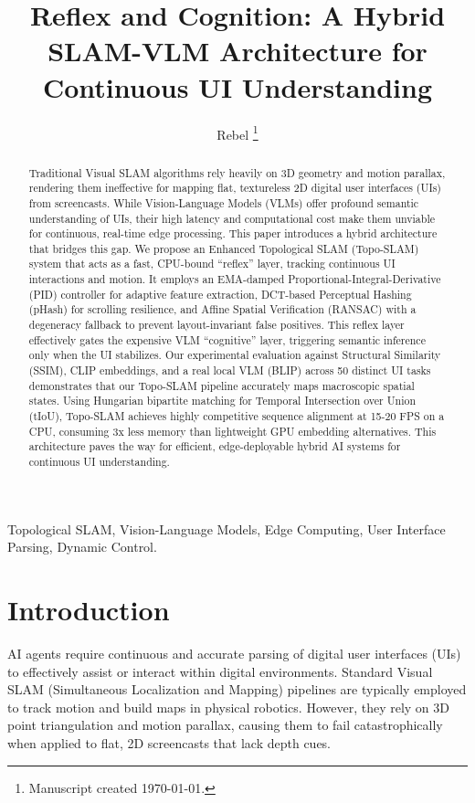 \documentclass[journal]{IEEEtran}
\begin{document}
\title{Reflex and Cognition: A Hybrid SLAM-VLM Architecture for Continuous UI Understanding}

\author{Rebel
\thanks{Manuscript created \today.}}

\maketitle

\begin{abstract}
Traditional Visual SLAM algorithms rely heavily on 3D geometry and motion parallax, rendering them ineffective for mapping flat, textureless 2D digital user interfaces (UIs) from screencasts. While Vision-Language Models (VLMs) offer profound semantic understanding of UIs, their high latency and computational cost make them unviable for continuous, real-time edge processing. This paper introduces a hybrid architecture that bridges this gap. We propose an Enhanced Topological SLAM (Topo-SLAM) system that acts as a fast, CPU-bound ``reflex'' layer, tracking continuous UI interactions and motion. It employs an EMA-damped Proportional-Integral-Derivative (PID) controller for adaptive feature extraction, DCT-based Perceptual Hashing (pHash) for scrolling resilience, and Affine Spatial Verification (RANSAC) with a degeneracy fallback to prevent layout-invariant false positives. This reflex layer effectively gates the expensive VLM ``cognitive'' layer, triggering semantic inference only when the UI stabilizes. Our experimental evaluation against Structural Similarity (SSIM), CLIP embeddings, and a real local VLM (BLIP) across 50 distinct UI tasks demonstrates that our Topo-SLAM pipeline accurately maps macroscopic spatial states. Using Hungarian bipartite matching for Temporal Intersection over Union (tIoU), Topo-SLAM achieves highly competitive sequence alignment at 15-20 FPS on a CPU, consuming 3x less memory than lightweight GPU embedding alternatives. This architecture paves the way for efficient, edge-deployable hybrid AI systems for continuous UI understanding.
\end{abstract}

\begin{IEEEkeywords}
Topological SLAM, Vision-Language Models, Edge Computing, User Interface Parsing, Dynamic Control.
\end{IEEEkeywords}

\section{Introduction}
 AI agents require continuous and accurate parsing of digital user interfaces (UIs) to effectively assist or interact within digital environments. Standard Visual SLAM (Simultaneous Localization and Mapping) pipelines are typically employed to track motion and build maps in physical robotics. However, they rely on 3D point triangulation and motion parallax, causing them to fail catastrophically when applied to flat, 2D screencasts that lack depth cues. 
\end{document}
